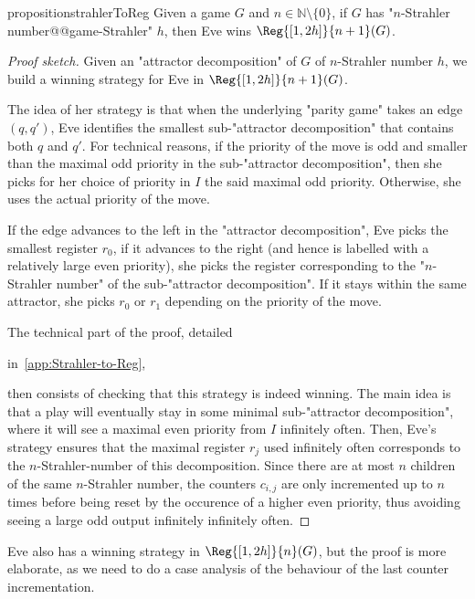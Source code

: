 \documentclass[a4paper,UKenglish,cleveref, autoref, thm-restate]{lipics-v2021}
\newif\ificalp
\newcommand{\NN}{\mathbb{N}}
\begin{document}
\begin{restatable}{proposition}{strahlerToReg}\label{lem:Strahler-to-Reg}
Given a game $G$ and $n\in \NN\setminus\{0\}$, if $G$ has "$n$-Strahler number@@game-Strahler" $h$, then Eve wins $\Reg{[1,2h]}{n+1}(G)$.
\end{restatable}

\begin{proof}[Proof sketch]
Given an "attractor decomposition" of $G$ of $n$-Strahler number $h$, we build a winning strategy for Eve in $\Reg{[1,2h]}{n+1}(G)$.

The idea of her strategy is that when the underlying "parity game" takes an edge $(q,q')$, Eve identifies the smallest sub-"attractor decomposition" that contains both $q$ and $q'$. For technical reasons, if the priority of the move is odd and smaller than the maximal odd priority in the sub-"attractor decomposition", then she picks for her choice of priority in $I$ the said maximal odd priority. Otherwise, she uses the actual priority of the move.

 If the edge advances to the left in the "attractor decomposition", Eve picks the smallest register $r_0$, if it advances to the right (and hence is labelled with a relatively large even priority), she picks the register corresponding to the "$n$-Strahler number" of the sub-"attractor decomposition". If it stays within the same attractor, she picks $r_0$ or $r_1$ depending on the priority of the move. 

The technical part of the proof, detailed 
\ificalp
in the full version,
\else
in~\cref{app:Strahler-to-Reg},
\fi
then consists of checking that this strategy is indeed winning. The main idea is that a play will eventually stay in some minimal sub-"attractor decomposition", where it will see a maximal even priority from $I$ infinitely often. Then, Eve's strategy ensures that the maximal register $r_j$ used infinitely often corresponds to the $n$-Strahler-number of this decomposition. Since there are at most $n$ children of the same $n$-Strahler number, the counters $c_{i,j}$ are only incremented up to $n$ times before being reset by the occurence of a higher even priority, thus avoiding seeing a large odd output infinitely infinitely often. \qedhere

\end{proof}


\begin{remark}
	 Eve also has a winning strategy in $\Reg{[1,2h]}{n}(G)$, but the proof is more elaborate, as we need to do a case analysis of the behaviour of the last counter incrementation.
\end{remark}
\end{document}
